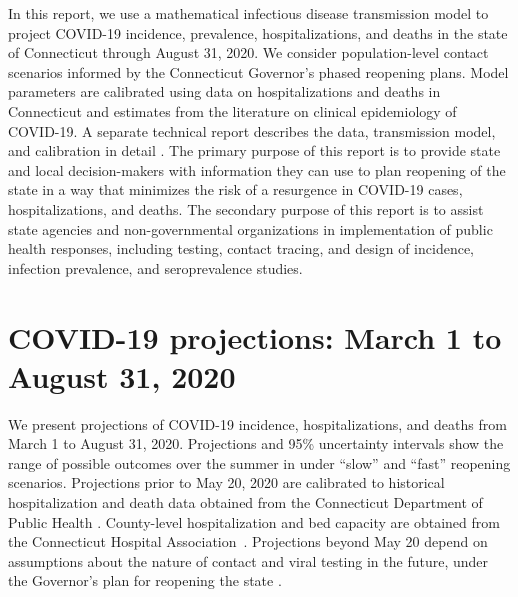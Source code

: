 \documentclass[11pt]{article}
\begin{document}

In this report, we use a mathematical infectious disease transmission model to project COVID-19 incidence, prevalence, hospitalizations, and deaths in the state of Connecticut through August 31, 2020.  We consider population-level contact scenarios informed by the Connecticut Governor's phased reopening plans.  Model parameters are calibrated using data on hospitalizations and deaths in Connecticut and estimates from the literature on clinical epidemiology of COVID-19.  A separate technical report describes the data, transmission model, and calibration in detail \citep{morozova2020tech}.  The primary purpose of this report is to provide state and local decision-makers with information they can use to plan reopening of the state in a way that minimizes the risk of a resurgence in COVID-19 cases, hospitalizations, and deaths.  The secondary purpose of this report is to assist state agencies and non-governmental organizations in implementation of public health responses, including testing, contact tracing, and design of incidence, infection prevalence, and seroprevalence studies. 



\section*{COVID-19 projections: March 1 to August 31, 2020}

We present projections of COVID-19 incidence, hospitalizations, and deaths from March 1 to August 31, 2020.  Projections and 95\% uncertainty intervals show the range of possible outcomes over the summer in under ``slow'' and ``fast'' reopening scenarios.  Projections prior to May 20, 2020 are calibrated to historical hospitalization and death data obtained from the Connecticut Department of Public Health \citep{DPHwebsite}.  County-level hospitalization and bed capacity are obtained from the Connecticut Hospital Association~\citep{CHAwebsite}.  Projections beyond May 20 depend on assumptions about the nature of contact and viral testing in the future, under the Governor's plan for reopening the state \citep{ct2020coronavirus}.  
\end{document}
